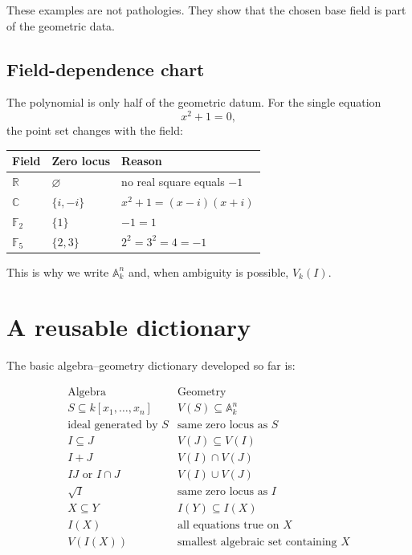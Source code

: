 These examples are not pathologies.  They show that the chosen base field is part of the
geometric data.

\subsection*{Field-dependence chart}

The polynomial is only half of the geometric datum.  For the single equation
\[
  x^2+1=0,
\]
the point set changes with the field:

\begin{center}
\begin{tabular}{@{}lll@{}}
\toprule
\textbf{Field} & \textbf{Zero locus} & \textbf{Reason}\\
\midrule
\(\mathbb R\) & \(\varnothing\) & no real square equals \(-1\)\\
\(\mathbb C\) & \(\{i,-i\}\) & \(x^2+1=(x-i)(x+i)\)\\
\(\mathbb F_2\) & \(\{1\}\) & \(-1=1\)\\
\(\mathbb F_5\) & \(\{2,3\}\) & \(2^2=3^2=4=-1\)\\
\bottomrule
\end{tabular}
\end{center}

This is why we write \(\mathbb A_k^n\) and, when ambiguity is possible,
\(V_k(I)\).

\section{A reusable dictionary}
\label{sec:vi01-dictionary}

The basic algebra--geometry dictionary developed so far is:

\[
\begin{array}{c|c}
\text{Algebra} & \text{Geometry}\\
\hline
S\subseteq k[x_1,\dots,x_n] & V(S)\subseteq\mathbb A_k^n\\
\text{ideal generated by }S & \text{same zero locus as }S\\
I\subseteq J & V(J)\subseteq V(I)\\
I+J & V(I)\cap V(J)\\
IJ\text{ or }I\cap J & V(I)\cup V(J)\\
\sqrt I & \text{same zero locus as }I\\
X\subseteq Y & I(Y)\subseteq I(X)\\
I(X) & \text{all equations true on }X\\
V(I(X)) & \text{smallest algebraic set containing }X
\end{array}
\]

